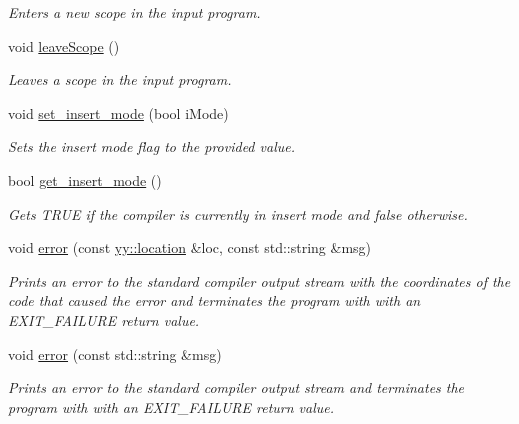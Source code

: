 \begin{DoxyCompactItemize}
\begin{DoxyCompactList}\small\item\em Enters a new scope in the input program. \end{DoxyCompactList}\item 
\hypertarget{classCCompiler_a2bccef2eb5e1f9a822ebca90f744ac2f}{void \hyperlink{classCCompiler_a2bccef2eb5e1f9a822ebca90f744ac2f}{leave\-Scope} ()}\label{classCCompiler_a2bccef2eb5e1f9a822ebca90f744ac2f}

\begin{DoxyCompactList}\small\item\em Leaves a scope in the input program. \end{DoxyCompactList}\item 
void \hyperlink{classCCompiler_a0517c73a064cdbd86b9d538464bf72fc}{set\-\_\-insert\-\_\-mode} (bool i\-Mode)
\begin{DoxyCompactList}\small\item\em Sets the insert mode flag to the provided value. \end{DoxyCompactList}\item 
bool \hyperlink{classCCompiler_a947d3b408eea7a9365b9d05f6f247142}{get\-\_\-insert\-\_\-mode} ()
\begin{DoxyCompactList}\small\item\em Gets T\-R\-U\-E if the compiler is currently in insert mode and false otherwise. \end{DoxyCompactList}\item 
void \hyperlink{classCCompiler_aeb15aaabe4c6eba50ae6448dc994d720}{error} (const \hyperlink{classyy_1_1location}{yy\-::location} \&loc, const std\-::string \&msg)
\begin{DoxyCompactList}\small\item\em Prints an error to the standard compiler output stream with the coordinates of the code that caused the error and terminates the program with with an E\-X\-I\-T\-\_\-\-F\-A\-I\-L\-U\-R\-E return value. \end{DoxyCompactList}\item 
void \hyperlink{classCCompiler_a42f25efb480223b1bf7a98606d57b8d4}{error} (const std\-::string \&msg)
\begin{DoxyCompactList}\small\item\em Prints an error to the standard compiler output stream and terminates the program with with an E\-X\-I\-T\-\_\-\-F\-A\-I\-L\-U\-R\-E return value. \end{DoxyCompactList}\item 

\end{DoxyCompactItemize}
